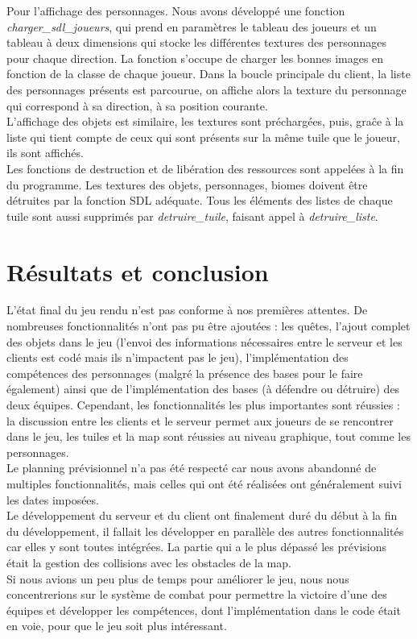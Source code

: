\documentclass[11pt]{article}
\begin{document}
            Pour l’affichage des personnages. Nous avons développé une fonction \textit{charger\_sdl\_joueurs}, qui prend en paramètres le tableau des joueurs et un tableau 
            à deux dimensions qui stocke les différentes textures des personnages pour chaque direction. La fonction s’occupe de charger les bonnes images en fonction de la classe de chaque joueur. 
            Dans la boucle principale du client, la liste des personnages présents est parcourue, on affiche alors la texture du personnage qui correspond à sa direction, 
            à sa position courante.\\
            L’affichage des objets est similaire, les textures sont préchargées, puis, graĉe à la liste qui tient compte de ceux qui sont présents sur la même tuile 
            que le joueur, ils sont affichés.\\
            Les fonctions de destruction et de libération des ressources sont appelées à la fin du programme. 
            Les textures des objets, personnages, biomes doivent être détruites par la fonction SDL adéquate. 
            Tous les éléments des listes de chaque tuile sont aussi supprimés par \textit{detruire\_tuile}, faisant appel à \textit{detruire\_liste}.

                
    \section{Résultats et conclusion}
    L’état final du jeu rendu n’est pas conforme à nos premières attentes. De nombreuses fonctionnalités n’ont pas pu être ajoutées : les quêtes, l’ajout complet des objets dans le jeu (l’envoi des informations nécessaires entre le serveur et les clients est codé mais ils n’impactent pas le jeu), l’implémentation des compétences des personnages (malgré la présence des bases pour le faire également) ainsi que de l'implémentation des bases (à défendre ou détruire) des deux équipes. Cependant, les fonctionnalités les plus importantes sont réussies : la discussion entre les clients et le serveur permet aux joueurs de se rencontrer dans le jeu, les tuiles et la map sont réussies au niveau graphique, tout comme les personnages.\\
    Le planning prévisionnel n’a pas été respecté car nous avons abandonné de multiples fonctionnalités, mais celles qui ont été réalisées ont généralement suivi les dates imposées.\\
    Le développement du serveur et du client ont finalement duré du début à la fin du développement, il fallait les développer en parallèle des autres fonctionnalités car elles y sont toutes intégrées. La partie qui a le plus dépassé les prévisions était la gestion des collisions avec les obstacles de la map.\\
    Si nous avions un peu plus de temps pour améliorer le jeu, nous nous concentrerions sur le système de combat pour permettre la victoire d’une des équipes et développer les compétences, dont l’implémentation dans le code était en voie, pour que le jeu soit plus intéressant.
    
\end{document}
